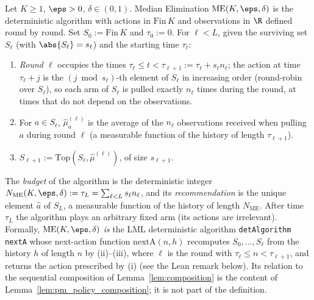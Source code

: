 \begin{definition}\label{def:median_elimination}
\leanok
{}
Let $K\ge1$, $\eps>0$, $\delta\in(0,1)$. Median Elimination $\mathrm{ME}(K,\eps,\delta)$ is the
deterministic algorithm with actions in $\mathrm{Fin}\,K$ and observations in $\R$ defined round
by round. Set $S_0 := \mathrm{Fin}\,K$ and $\tau_0 := 0$. For $\ell<L$, given the surviving set
$S_\ell$ (with $\abs{S_\ell} = s_\ell$) and the starting time $\tau_\ell$:
\begin{enumerate}
  \item[(i)] \emph{Round $\ell$} occupies the times $\tau_\ell\le t<\tau_{\ell+1} := \tau_\ell + s_\ell n_\ell$;
        the action at time $\tau_\ell + j$ is the $(j\bmod s_\ell)$-th element of $S_\ell$ in
        increasing order (round-robin over $S_\ell$), so each arm of $S_\ell$ is pulled exactly
        $n_\ell$ times during the round, at times that do not depend on the observations.
  \item[(ii)] For $a\in S_\ell$, $\hat\mu^{(\ell)}_a$ is the average of the $n_\ell$ observations
        received when pulling $a$ during round $\ell$ (a measurable function of the history of
        length $\tau_{\ell+1}$).
  \item[(iii)] $S_{\ell+1} := \mathrm{Top}(S_\ell,\hat\mu^{(\ell)})$, of size $s_{\ell+1}$.
\end{enumerate}
The \emph{budget} of the algorithm is the deterministic integer
$N_{\mathrm{ME}}(K,\eps,\delta) := \tau_L = \sum_{\ell<L}s_\ell n_\ell$, and its
\emph{recommendation} is the unique element $\hat a$ of $S_L$, a measurable function of the
history of length $N_{\mathrm{ME}}$. After time $\tau_L$ the algorithm plays an arbitrary fixed
arm (its actions are irrelevant). Formally, $\mathrm{ME}(K,\eps,\delta)$ \emph{is} the LML
deterministic algorithm \texttt{detAlgorithm nextA} whose next-action function
$\mathrm{nextA}(n,h)$ recomputes $S_0,\dots,S_\ell$ from the history $h$ of length $n$ by
(ii)--(iii), where $\ell$ is the round with $\tau_\ell\le n<\tau_{\ell+1}$, and returns the
action prescribed by (i) (see the Lean remark below). Its relation to the sequential
composition of Lemma~\ref{lem:composition} is the content of
Lemma~\ref{lem:pm_policy_composition}; it is not part of the definition.
\end{definition}

